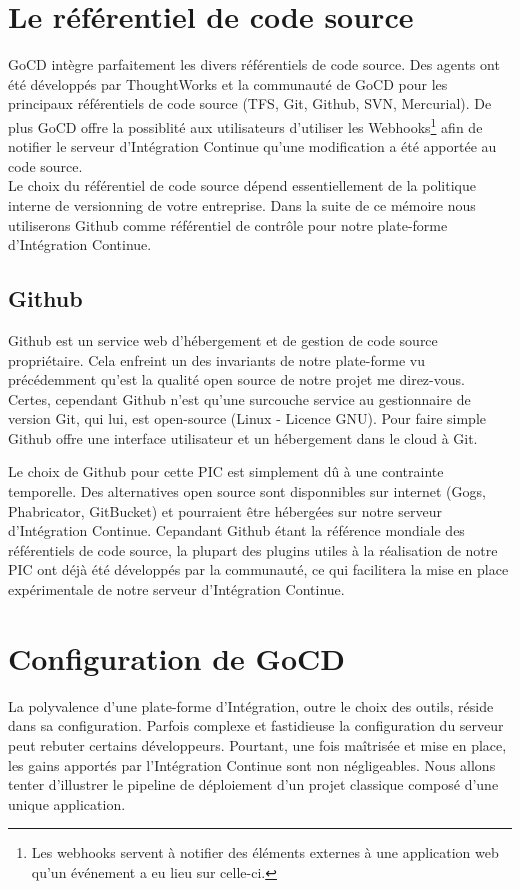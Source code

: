     \section{Le référentiel de code source}\label{Repository}
    GoCD intègre parfaitement les divers référentiels de code source. Des agents ont été développés par ThoughtWorks et la communauté de GoCD pour les principaux référentiels de code source (TFS, Git, Github, SVN, Mercurial). De plus GoCD offre la possiblité aux utilisateurs d'utiliser les Webhooks\footnote{Les webhooks servent à notifier des éléments externes à une application web qu'un événement a eu lieu sur celle-ci.} afin de notifier le serveur d'Intégration Continue qu'une modification a été apportée au code source.\\

    Le choix du référentiel de code source dépend essentiellement de la politique interne de versionning de votre entreprise. Dans la suite de ce mémoire nous utiliserons Github comme référentiel de contrôle pour notre plate-forme d'Intégration Continue.

      \subsection{Github}
      Github est un service web d'hébergement et de gestion de code source propriétaire. Cela enfreint un des invariants de notre plate-forme vu précédemment qu'est la qualité open source de notre projet me direz-vous. Certes, cependant Github n'est qu'une surcouche service au gestionnaire de version Git, qui lui, est open-source (Linux - Licence GNU). Pour faire simple Github offre une interface utilisateur et un hébergement dans le cloud à Git.

      Le choix de Github pour cette PIC est simplement dû à une contrainte temporelle. Des alternatives open source sont disponnibles sur internet (Gogs, Phabricator, GitBucket) et pourraient être hébergées sur notre serveur d'Intégration Continue. Cepandant Github étant la référence mondiale des référentiels de code source, la plupart des plugins utiles à la réalisation de notre PIC ont déjà été développés par la communauté, ce qui facilitera la mise en place expérimentale de notre serveur d'Intégration Continue.

    \section{Configuration de GoCD}
    La polyvalence d'une plate-forme d'Intégration, outre le choix des outils, réside dans sa configuration. Parfois complexe et fastidieuse la configuration du serveur peut rebuter certains développeurs. Pourtant, une fois maîtrisée et mise en place, les gains apportés par l'Intégration Continue sont non négligeables. Nous allons tenter d'illustrer le pipeline de déploiement d'un projet classique composé d'une unique application.

